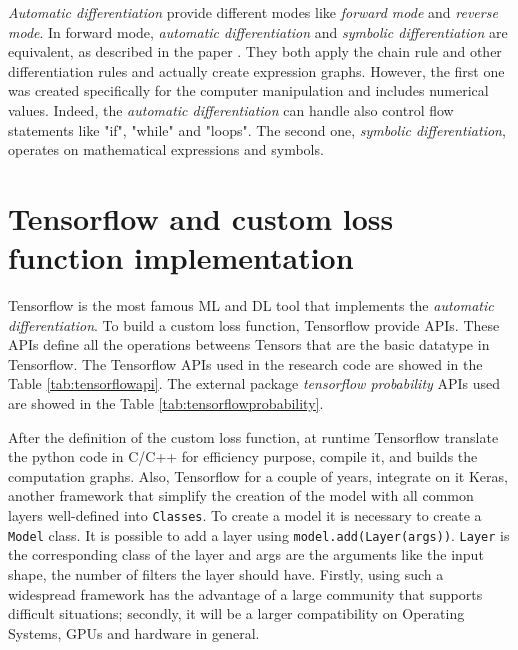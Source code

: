 \documentclass[12pt]{report}
\begin{document}
\textit{Automatic differentiation} provide different modes like \textit{forward mode} and \textit{reverse mode}.
In forward mode, \textit{automatic differentiation} and \textit{symbolic differentiation} are equivalent, as described in the paper \cite{auto_symbol}.
They both apply the chain rule and other differentiation rules and actually create expression graphs.
However, the first one was created specifically for the computer manipulation and includes numerical values. 
Indeed, the \textit{automatic differentiation} can handle also control flow statements like "if", "while" and "loops".
The second one, \textit{symbolic differentiation}, operates on mathematical expressions and symbols.

\section{Tensorflow and custom loss function implementation}
Tensorflow is the most famous ML and DL tool that implements the \textit{automatic differentiation}.
To build a custom loss function, Tensorflow provide APIs. These APIs define all the operations betweens Tensors that are the basic datatype in Tensorflow.
The Tensorflow APIs used in the research code are showed in the Table \ref{tab:tensorflowapi}.
The external package \textit{tensorflow probability} APIs used are showed in the Table \ref{tab:tensorflowprobability}.

After the definition of the custom loss function, at runtime Tensorflow translate the python code in C/C++ for efficiency purpose, compile it, and builds the computation graphs.
Also, Tensorflow for a couple of years, integrate on it Keras, another framework that simplify the creation of the model with 
all common layers well-defined into \texttt{Classes}.
To create a model it is necessary to create a \texttt{Model} class.
It is possible to add a layer using \texttt{model.add(Layer(args))}.
\texttt{Layer} is the corresponding class of the layer and args are the arguments like the input shape, the number of filters the layer should have. 
Firstly, using such a widespread framework has the advantage of a large community that supports difficult situations;
secondly, it will be a larger compatibility on Operating Systems, GPUs and hardware in general.
\end{document}
